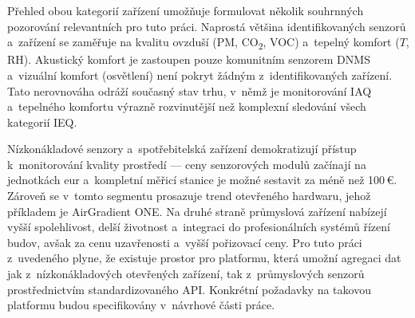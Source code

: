 Přehled obou kategorií zařízení umožňuje formulovat několik souhrnných pozorování relevantních pro tuto práci. Naprostá většina identifikovaných senzorů a~zařízení se zaměřuje na kvalitu ovzduší (PM, CO\textsubscript{2}, VOC) a~tepelný komfort ($T$, RH). Akustický komfort je zastoupen pouze komunitním senzorem DNMS a~vizuální komfort (osvětlení) není pokryt žádným z~identifikovaných zařízení. Tato nerovnováha odráží současný stav trhu, v~němž je monitorování IAQ a~tepelného komfortu výrazně rozvinutější než komplexní sledování všech kategorií IEQ.

Nízkonákladové senzory a~spotřebitelská zařízení demokratizují přístup k~monitorování kvality prostředí --- ceny senzorových modulů začínají na jednotkách eur a~kompletní měřicí stanice je možné sestavit za méně než 100\,€. Zároveň se v~tomto segmentu prosazuje trend otevřeného hardwaru, jehož příkladem je AirGradient ONE. Na druhé straně průmyslová zařízení nabízejí vyšší spolehlivost, delší životnost a~integraci do profesionálních systémů řízení budov, avšak za cenu uzavřenosti a~vyšší pořizovací ceny. Pro tuto práci z~uvedeného plyne, že existuje prostor pro platformu, která umožní agregaci dat jak z~nízkonákladových otevřených zařízení, tak z~průmyslových senzorů prostřednictvím standardizovaného API. Konkrétní požadavky na takovou platformu budou specifikovány v~návrhové části práce.
